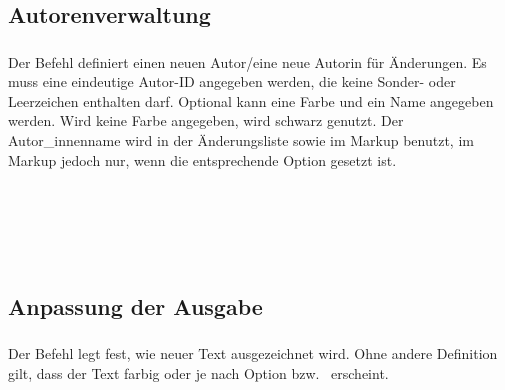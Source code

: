 \begin{chusage}
		\>
\end{chusage}



\subsection{Autorenverwaltung}
\label{sec:user:authormanagement}

\subsubsection{}

Der Befehl  definiert einen neuen Autor/eine neue Autorin für Änderungen.
Es muss eine eindeutige Autor-ID angegeben werden, die keine Sonder- oder Leerzeichen enthalten darf.
Optional kann eine Farbe und ein Name angegeben werden.
Wird keine Farbe angegeben, wird schwarz genutzt.
Der Autor\_innenname wird in der Änderungsliste sowie im Markup benutzt, im Markup jedoch nur, wenn die entsprechende Option gesetzt ist.

\begin{chusage}
		\>\\
	\usageexample
		\>\\
		\>\\
		\>\\
		\>
\end{chusage}


\subsection{Anpassung der Ausgabe}
\label{sec:user:customizingoutput}

\subsubsection{}
\DescribeMacro{\setaddedmarkup}

Der Befehl  legt fest, wie neuer Text ausgezeichnet wird.
Ohne andere Definition gilt, dass der Text farbig oder je nach Option  bzw.\  erscheint.

